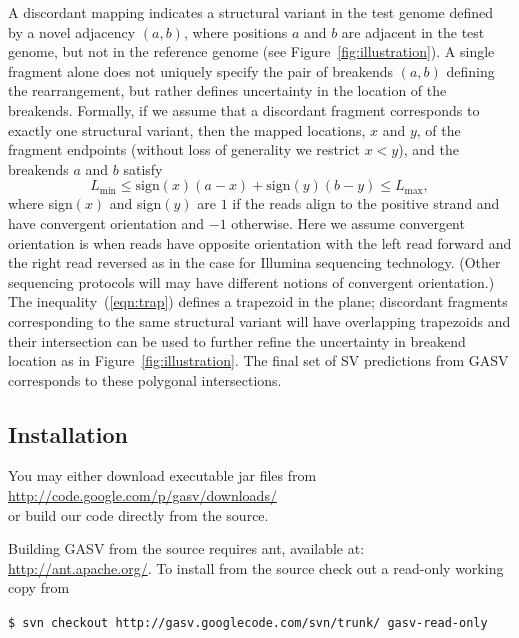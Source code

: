 \documentclass[11pt]{article}
\begin{document}
A discordant mapping indicates a structural variant in the test genome defined by a novel adjacency $(a,b)$, where positions $a$ and $b$ are adjacent in the test genome, but not in the reference genome (see Figure~\ref{fig:illustration}). A single fragment alone does not uniquely specify the pair of breakends $(a,b)$ defining the rearrangement, but rather defines uncertainty in the location of the breakends. Formally, if we assume that a discordant fragment corresponds to exactly one structural variant, then the mapped locations, $x$ and $y$, of the fragment endpoints (without loss of generality we restrict $x < y$), and the breakends $a$ and $b$ satisfy
\begin{equation}
L_{\min} \le \text{sign}(x)(a - x) + \text{sign}(y) (b - y) \le L_{\max}, \nonumber
\label{eqn:trap}
\end{equation}
\noindent where sign$(x)$ and sign$(y)$ are $1$ if the reads align to the positive strand and have convergent orientation and $-1$ otherwise. Here we assume convergent orientation is when reads have opposite orientation with the left read forward and the right read reversed as in the case for Illumina sequencing technology. (Other sequencing protocols will may have different notions of convergent orientation.)  The inequality~(\ref{eqn:trap}) defines a trapezoid in the plane; discordant fragments corresponding to the same structural variant will have overlapping trapezoids and their intersection can be used to further refine the uncertainty in breakend location as in Figure~\ref{fig:illustration}. The final set of SV predictions from GASV corresponds to these polygonal intersections. 

\subsection{Installation}

You may either download executable jar files from\\

\noindent \url{http://code.google.com/p/gasv/downloads/}\\

\noindent or build our code directly from the source.  

Building GASV from the source requires ant, available at: \url{http://ant.apache.org/}. To install from the source check out a read-only working copy from 

\begin{framed}
{\normalsize
\noindent \texttt{\$ svn checkout http://gasv.googlecode.com/svn/trunk/ gasv-read-only}
}
\end{framed}
\end{document}
